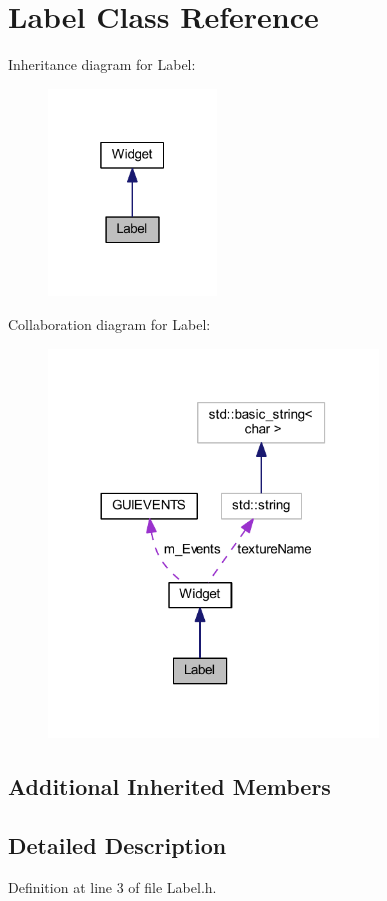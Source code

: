 \hypertarget{class_label}{}\section{Label Class Reference}
\label{class_label}


Inheritance diagram for Label\+:
\nopagebreak
\begin{figure}[H]
\begin{center}
\leavevmode
\includegraphics[width=127pt]{class_label__inherit__graph}
\end{center}
\end{figure}


Collaboration diagram for Label\+:
\nopagebreak
\begin{figure}[H]
\begin{center}
\leavevmode
\includegraphics[width=248pt]{class_label__coll__graph}
\end{center}
\end{figure}
\subsection*{Additional Inherited Members}


\subsection{Detailed Description}


Definition at line 3 of file Label.\+h.

